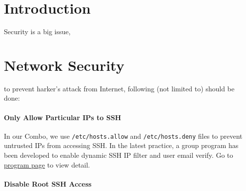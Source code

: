 \section{Introduction}
Security is a big issue, 
\section{Network Security}
to prevent harker's attack from Internet, following (not limited to) should be done:
\paragraph{Only Allow Particular IPs to SSH}
In our Combo, we use {\tt /etc/hosts.allow} and {\tt /etc/hosts.deny} files to prevent untrusted IPs from accessing SSH. In the latest practice, a group program has been developed to enable dynamic SSH IP filter and user email verify. Go to \href{https://ourphysics.org/wiki/index.php/Program:SSH_Mail_Verifier}{program page} to view detail.
\paragraph{Disable Root SSH Access}